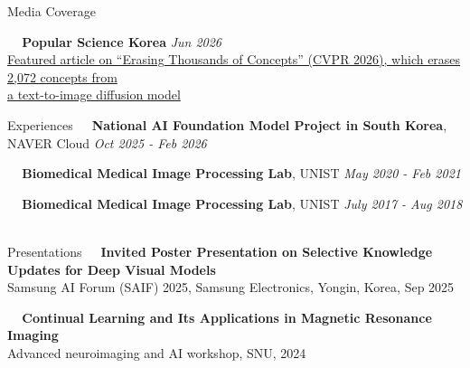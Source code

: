 \documentclass{resume} %
\begin{document}
\begin{rSection}{Media Coverage}

\textbullet~\,\, {\bf Popular Science Korea} \hfill {\it Jun 2026}
\\ \hspace*{1.5em}\href{https://www.popsci.co.kr/news/articleView.html?idxno=24647}{Featured article on ``Erasing Thousands of Concepts'' (CVPR 2026), which erases 2,072 concepts from} \\ \hspace*{1.5em}\href{https://www.popsci.co.kr/news/articleView.html?idxno=24647}{a text-to-image diffusion model} \\

\end{rSection}


\begin{rSection}{Experiences}
\textbullet~\,\, {\bf National AI Foundation Model Project in South Korea}{, NAVER Cloud} \hfill {\it Oct 2025 - Feb 2026}
\\\hspace*{1.5em}{Visiting Student Researcher} 

\textbullet~\,\, 
{\bf Biomedical Medical Image Processing Lab}{, UNIST} \hfill {\it May 2020 - Feb 2021}
\\ \hspace*{1.5em}{Researcher (Advisor: Prof. Se Young Chun)} 

\textbullet~\,\, 
{\bf Biomedical Medical Image Processing Lab}{, UNIST}  \hfill {\it July 2017 - Aug 2018}
\\ \hspace*{1.5em}{Student Intership (Advisor: Prof. Se Young Chun)} \\
\end{rSection}





\begin{rSection}{Presentations}
\textbullet~\,\, \textbf{Invited Poster Presentation on Selective Knowledge Updates for Deep Visual Models}
\\ \hspace*{1.5em}Samsung AI Forum (SAIF) 2025, Samsung Electronics, Yongin, Korea, Sep 2025

\textbullet~\,\, \textbf{Continual Learning and Its Applications in Magnetic Resonance Imaging}
\\ \hspace*{1.5em}Advanced neuroimaging and AI workshop, SNU, 2024 \\
\end{rSection}
\end{document}
